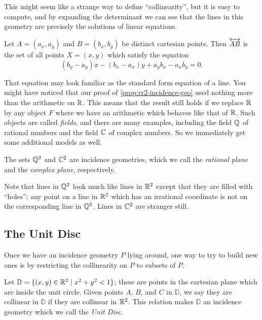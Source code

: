 This might seem like a strange way to define ``collinearity'', but it is easy to compute, and by expanding the determinant we can see that the lines in this geometry are precisely the solutions of linear equations.

\begin{cor}[Lines in \(\RR^2\)] \label{cor:cartesian-lines}
Let \(A = (a_x, a_y)\) and \(B = (b_x, b_y)\) be distinct cartesian points.
Then \(\overleftrightarrow{AB}\) is the set of all points \(X = (x,y)\) which satisfy the equation \[ (b_y-a_y)x - (b_x-a_x)y + a_yb_x - a_xb_y = 0. \]
\end{cor}

That equation may look familiar as the standard form equation of a line.
You might have noticed that our proof of \ref{prop:rr2-incidence-geo} used nothing more than the arithmetic on \(\mathbb{R}\).
This means that the result still holds if we replace \(\mathbb{R}\) by any object \(F\) where we have an arithmetic which behaves like that of \(\mathbb{R}\).
Such objects are called \emph{fields}, and there are many examples, including the field \(\mathbb{Q}\) of rational numbers and the field \(\mathbb{C}\) of complex numbers.
So we immediately get some additional models as well.

\begin{cor}
The sets \(\mathbb{Q}^2\) and \(\mathbb{C}^2\) are incidence geometries, which we call the \emph{rational plane} and the \emph{complex plane}, respectively.
\end{cor}

Note that lines in \(\mathbb{Q}^2\) look much like lines in \(\RR^2\) except that they are filled with ``holes''; any point on a line in \(\RR^2\) which has an irrational coordinate is not on the corresponding line in \(\mathbb{Q}^2\).
Lines in \(\mathbb{C}^2\) are stranger still.



\subsection{The Unit Disc}

Once we have an incidence geometry \(P\) lying around, one way to try to build new ones is by restricting the collinearity on \(P\) to subsets of \(P\).

\begin{prop}
Let \(\mathbb{D} = \{ (x,y) \in \mathbb{R}^2 \mid x^2 + y^2 < 1 \}\); these are points in the cartesian plane which are inside the unit circle.
Given points \(A\), \(B\), and \(C\) in \(\mathbb{D}\), we say they are collinear in \(\mathbb{D}\) if they are collinear in \(\RR^2\).
This relation makes \(\mathbb{D}\) an incidence geometry which we call the \emph{Unit Disc}.
\end{prop}


